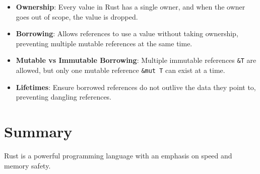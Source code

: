 \documentclass{article}
\begin{document}
\begin{itemize}
  \item \textbf{Ownership}: Every value in Rust has a single owner, and when the owner goes out of scope, the value is dropped.
  \item \textbf{Borrowing}: Allows references to use a value without taking ownership, preventing multiple mutable references at the same time.
  \item \textbf{Mutable vs Immutable Borrowing}: Multiple immutable references
  \texttt{\&T} are allowed, but only one mutable reference \texttt{\&mut T} can exist at a time.
  \item \textbf{Lifetimes}: Ensure borrowed references do not outlive the data they point to, preventing dangling references.
\end{itemize}

\section{Summary}

Rust is a powerful programming language with an emphasis on speed and memory
safety.
\end{document}
